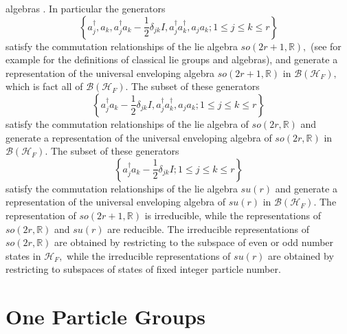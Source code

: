 \documentclass[aps,preprint]{revtex4}%
\begin{document}
algebras \cite{Encyclo}. In particular the generators
\begin{equation}
\left\{  a_{j}^{\dagger},a_{k},a_{j}^{\dagger}a_{k}-\frac{1}{2}\delta
_{jk}I,a_{j}^{\dagger}a_{k}^{\dagger},a_{j}a_{k};1\leq j\leq k\leq r\right\}
\end{equation}
satisfy the commutation relationships of the lie algebra $so\left(
2r+1,\mathbb{R}\right)  ,$ (see \cite{Gilmore_book} for example for the
definitions of classical lie groups and algebras), and generate a
representation of the universal enveloping algebra $so\left(  2r+1,\mathbb{R}%
\right)  $ in $\mathcal{B}\left(  \mathcal{H}_{F}\right)  ,$ which is fact all
of $\mathcal{B}\left(  \mathcal{H}_{F}\right)  .$ The subset of these
generators
\begin{equation}
\left\{  a_{j}^{\dagger}a_{k}-\frac{1}{2}\delta_{jk}I,a_{j}^{\dagger}%
a_{k}^{\dagger},a_{j}a_{k};1\leq j\leq k\leq r\right\}
\end{equation}
satisfy the commutation relationships of the lie algebra of $so\left(
2r,\mathbb{R}\right)  $ and generate a representation of the universal
enveloping algebra of $so\left(  2r,\mathbb{R}\right)  $ in $\mathcal{B}%
\left(  \mathcal{H}_{F}\right)  .$ The subset of these generators
\begin{equation}
\left\{  a_{j}^{\dagger}a_{k}-\frac{1}{2}\delta_{jk}I;1\leq j\leq k\leq
r\right\}
\end{equation}
satisfy the commutation relationships of the lie algebra $su\left(  r\right)
$ and generate a representation of the universal enveloping algebra of
$su\left(  r\right)  $ in $\mathcal{B}\left(  \mathcal{H}_{F}\right)  $. The
representation of $so\left(  2r+1,\mathbb{R}\right)  $ is irreducible, while
the representations of $so\left(  2r,\mathbb{R}\right)  $ and $su\left(
r\right)  $ are reducible. The irreducible representations of $so\left(
2r,\mathbb{R}\right)  $ are obtained by restricting to the subspace of even or
odd number states in $\mathcal{H}_{F},$ while the irreducible representations
of $su\left(  r\right)  $ are obtained by restricting to subspaces of states
of fixed integer particle number.

\section{One Particle Groups \label{one particle groups}}
\end{document}
